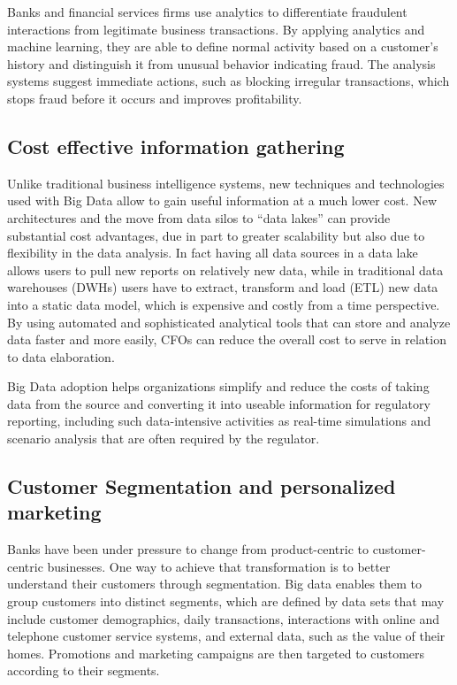 \documentclass[sigconf]{acmart}
\begin{document}
Banks and financial services firms use analytics to differentiate fraudulent interactions from legitimate business transactions. By applying analytics and machine learning, they are able to define normal activity based on a customer's history and distinguish it from unusual behavior indicating fraud. The analysis systems suggest immediate actions, such as blocking irregular transactions, which stops fraud before it occurs and improves profitability.\cite{5-big-data-use-cases-in-banking-and-financial-services}

\subsection{Cost effective information gathering}

Unlike traditional business intelligence systems, new techniques and technologies used with Big Data allow to gain useful information at a much lower cost. New architectures and the move from data silos to “data lakes” can provide substantial cost advantages, due in part
to greater scalability but also due to flexibility in the data analysis. In fact having all data sources in a data lake allows users to pull new reports on relatively new data, while in traditional data warehouses (DWHs) users have to extract, transform and load (ETL) new data into a static data model, which is expensive and costly from a time perspective. By using automated and sophisticated analytical tools that can store and analyze data faster and more easily, CFOs can reduce the overall cost to serve in relation to data elaboration.\cite{Accenture-Next-Generation-Financial}

Big Data adoption helps organizations
simplify and reduce the costs of taking
data from the source and converting it
into useable information for regulatory
reporting, including such data-intensive
activities as real-time simulations and
scenario analysis that are often required
by the regulator.

\subsection{Customer Segmentation and personalized marketing}

Banks have been under pressure to change from product-centric to customer-centric businesses. One way to achieve that transformation is  to better understand their customers through segmentation. Big data enables them to  group customers into distinct segments, which are defined by data sets that may include customer demographics, daily transactions, interactions with online and telephone customer service systems, and external data, such as the value of their homes. Promotions and marketing campaigns are then targeted to customers according to their  segments.\cite{5-big-data-use-cases-in-banking-and-financial-services}
\end{document}
